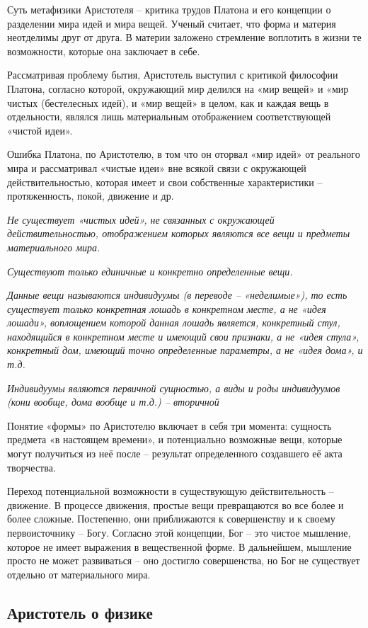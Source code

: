\documentclass[a4paper, 14pt]{extreport}
\begin{document}
Суть метафизики Аристотеля -- критика трудов Платона и его концепции о
разделении мира идей и мира вещей. Ученый считает, что форма и материя
неотделимы друг от друга. В материи заложено стремление воплотить в
жизни те возможности, которые она заключает в себе.

Рассматривая проблему бытия, Аристотель выступил с критикой философии
Платона, согласно которой, окружающий мир делился на «мир вещей» и «мир
чистых (бестелесных идей), и «мир вещей» в целом, как и каждая вещь в
отдельности, являлся лишь материальным отображением соответствующей
«чистой идеи».

Ошибка Платона, по Аристотелю, в том что он оторвал «мир идей» от
реального мира и рассматривал «чистые идеи» вне всякой связи с
окружающей действительностью, которая имеет и свои собственные
характеристики -- протяженность, покой, движение и др.

\emph{Не существует «чистых идей», не связанных с окружающей
действительностью, отображением которых являются все вещи и предметы
материального мира.}

\emph{Существуют только единичные и конкретно определенные вещи.}

\emph{Данные вещи называются индивидуумы (в переводе -- «неделимые»), то
есть существует только конкретная лошадь в конкретном месте, а не «идея
лошади», воплощением которой данная лошадь является, конкретный стул,
находящийся в конкретном месте и имеющий свои признаки, а не «идея
стула», конкретный дом, имеющий точно определенные параметры, а не «идея
дома», и т.д.}

\emph{Индивидуумы являются первичной сущностью, а виды и роды
индивидуумов (кони вообще, дома вообще и т.д.) -- вторичной}

Понятие «формы» по Аристотелю включает в себя три момента: сущность
предмета «в настоящем времени», и потенциально возможные вещи, которые
могут получиться из неё после -- результат определенного создавшего её
акта творчества.

Переход потенциальной возможности в существующую действительность --
движение. В процессе движения, простые вещи превращаются во все более и
более сложные. Постепенно, они приближаются к совершенству и к своему
первоисточнику -- Богу. Согласно этой концепции, Бог -- это чистое
мышление, которое не имеет выражения в вещественной форме. В дальнейшем,
мышление просто не может развиваться -- оно достигло совершенства, но
Бог не существует отдельно от материального мира.

\subsection{Аристотель о физике}
\end{document}
